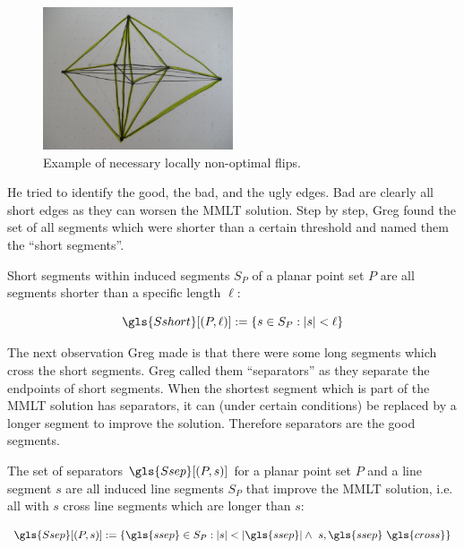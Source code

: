 \begin{figure}[ht]
  \centering
  \includegraphics[width=0.5\textwidth]{img/example_nonoptimal_flips.jpg}
  \caption{Example of necessary locally non-optimal flips.\label{fig:nonoptimal_flips}}
\end{figure}

He tried to identify the good, the bad, and the ugly edges. Bad are
clearly all short edges as they can worsen the \gls{MMLT} solution.
Step by step, Greg found the set of all segments which were
shorter than a certain threshold and named them the
``short segments''.

\begin{definition}\label{def:short_segments}
  Short segments within induced segments \(S_P\) of a planar 
  point set \(P\) are all segments shorter than a specific length
  \(\ell\):

  \[
    \gls{Sshort}[(P, \ell)] := \{ s \in S_P : |s| < \ell \}
  \]
\end{definition}

The next observation Greg made is that there were some long segments
which cross the short segments. Greg called them ``separators'' as
they separate the endpoints of short segments. When the shortest
segment which is part of the \gls{MMLT} solution has separators, it
can (under certain conditions) be replaced by a longer segment to
improve the solution. Therefore separators are the good segments.

\begin{definition}[Separators]\label{def:separators}
  The set of separators \(\gls{Ssep}[(P, s)]\) for a planar point set
  \(P\) and a line segment
  \(s\) are all induced line segments \(S_P\) that improve the
  \gls{MMLT} solution, i.e. all with \(s\) \gls{cross} line segments
  which are longer than \(s\):

  \[
	  \gls{Ssep}[(P,s)] := \{
		  \gls{ssep} \in S_P :
		  |s| < |\gls{ssep}|\land~ s,\gls{ssep}~\gls{cross}
	  \}
  \]
\end{definition}

